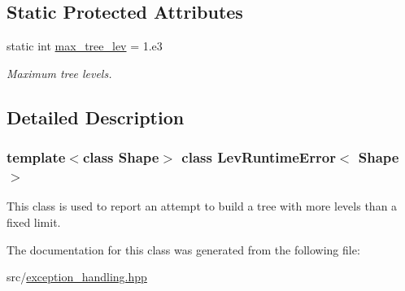 \subsection*{Static Protected Attributes}
\begin{DoxyCompactItemize}
\item 
\hypertarget{classLevRuntimeError_a059c75733530dac291cd5eef1b204b81}{
static int \hyperlink{classLevRuntimeError_a059c75733530dac291cd5eef1b204b81}{max\_\-tree\_\-lev} = 1.e3}
\label{classLevRuntimeError_a059c75733530dac291cd5eef1b204b81}

\begin{DoxyCompactList}\small\item\em Maximum tree levels. \item\end{DoxyCompactList}\end{DoxyCompactItemize}


\subsection{Detailed Description}
\subsubsection*{template$<$class Shape$>$ class LevRuntimeError$<$ Shape $>$}

This class is used to report an attempt to build a tree with more levels than a fixed limit. 

The documentation for this class was generated from the following file:\begin{DoxyCompactItemize}
\item 
src/\hyperlink{exception__handling_8hpp}{exception\_\-handling.hpp}\end{DoxyCompactItemize}
